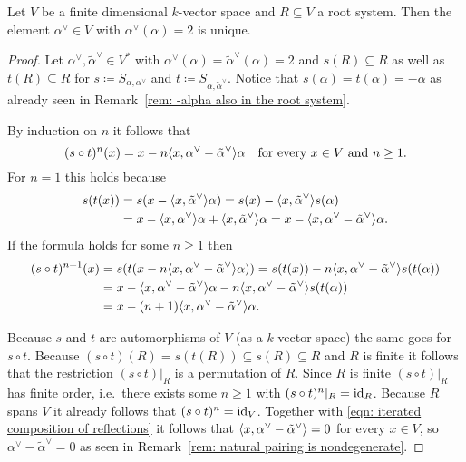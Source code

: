\begin{lemma}
 Let $V$ be a finite dimensional $k$-vector space and $R \subseteq V$ a root system. Then the element $\alpha^\vee \in V$ with $\alpha^\vee(\alpha) = 2$ is unique.
\end{lemma}
\begin{proof}
 Let $\alpha^\vee, \tilde{\alpha}^\vee \in V^*$ with $\alpha^\vee(\alpha) = \tilde{\alpha}^\vee(\alpha) = 2$ and $s(R) \subseteq R$ as well as $t(R) \subseteq R$ for $s \coloneqq S_{\alpha, \alpha^\vee}$ and $t \coloneqq S_{\alpha, \tilde{\alpha}^\vee}$. Notice that $s(\alpha) = t(\alpha) = -\alpha$ as already seen in Remark~\ref{rem: -alpha also in the root system}.
 
 By induction on $n$ it follows that
 \begin{equation}\label{eqn: iterated composition of reflections}
  (s \circ t)^n(x) =  x - n\langle x,\alpha^\vee - \tilde{\alpha}^\vee\rangle \alpha
  \quad \text{for every $x \in V$ and $n \geq 1$}.
 \end{equation}
 For $n = 1$ this holds because
 \begin{align*}
  s(t(x))
  &= s(x - \langle x, \tilde{\alpha}^\vee\rangle\alpha)
  = s(x) - \langle x, \tilde{\alpha}^\vee\rangle s(\alpha) \\
  &= x - \langle x, \alpha^\vee\rangle\alpha + \langle x, \tilde{\alpha}^\vee\rangle\alpha
  = x - \langle x, \alpha^\vee - \tilde{\alpha}^\vee\rangle \alpha.
 \end{align*}
 If the formula holds for some $n \geq 1$ then
 \begin{align*}
  (s \circ t)^{n+1}(x)
  &= s(t(x - n\langle x,\alpha^\vee - \tilde{\alpha}^\vee\rangle \alpha))
  = s(t(x)) - n\langle x,\alpha^\vee - \tilde{\alpha}^\vee\rangle s(t(\alpha)) \\
  &= x - \langle x, \alpha^\vee - \tilde{\alpha}^\vee\rangle \alpha - n\langle x,\alpha^\vee - \tilde{\alpha}^\vee\rangle s(t(\alpha)) \\
  &= x - (n+1)\langle x, \alpha^\vee - \tilde{\alpha}^\vee\rangle \alpha.
 \end{align*}
 
 Because $s$ and $t$ are automorphisms of $V$ (as a $k$-vector space) the same goes for $s \circ t$. Because $(s \circ t)(R) = s(t(R)) \subseteq s(R) \subseteq R$ and $R$ is finite it follows that the restriction $(s \circ t)|_R$ is a permutation of $R$. Since $R$ is finite $(s \circ t)|_R$ has finite order, i.e.\ there exists some $n \geq 1$ with $(s \circ t)^n|_R = \operatorname{id}_R$. Because $R$ spans $V$ it already follows that $(s \circ t)^n = \operatorname{id}_V$. Together with \eqref{eqn: iterated composition of reflections} it follows that $\langle x, \alpha^\vee - \tilde{\alpha}^\vee\rangle = 0$ for every $x \in V$, so $\alpha^\vee - \tilde{\alpha}^\vee = 0$ as seen in Remark~\ref{rem: natural pairing is nondegenerate}.
\end{proof}


















